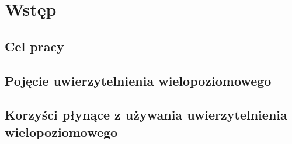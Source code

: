 \chapter{Wstęp}

\section{Cel pracy}
\section{Pojęcie uwierzytelnienia wielopoziomowego}
\section{Korzyści płynące z używania uwierzytelnienia wielopoziomowego}


